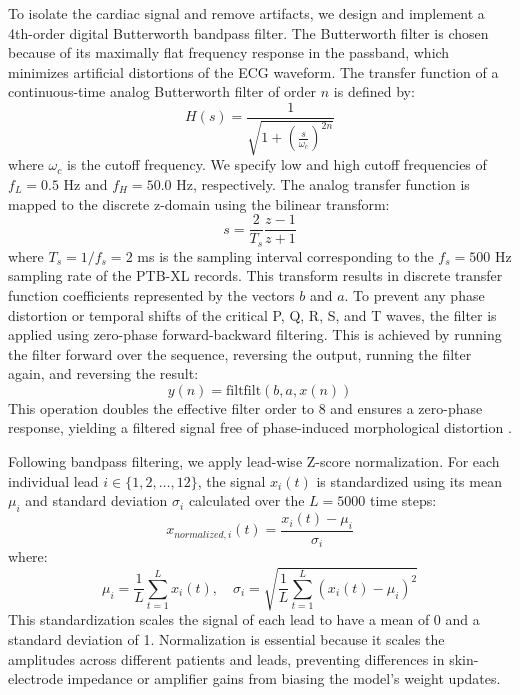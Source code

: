 \documentclass[12pt,a4paper]{report}
\begin{document}
To isolate the cardiac signal and remove artifacts, we design and implement a 4th-order digital Butterworth bandpass filter. The Butterworth filter is chosen because of its maximally flat frequency response in the passband, which minimizes artificial distortions of the ECG waveform. The transfer function of a continuous-time analog Butterworth filter of order $n$ is defined by:
\begin{equation}
    H(s) = \frac{1}{\sqrt{1 + \left(\frac{s}{\omega_c}\right)^{2n}}}
\end{equation}
where $\omega_c$ is the cutoff frequency. We specify low and high cutoff frequencies of $f_L = 0.5$ Hz and $f_H = 50.0$ Hz, respectively. The analog transfer function is mapped to the discrete z-domain using the bilinear transform:
\begin{equation}
    s = \frac{2}{T_s} \frac{z - 1}{z + 1}
\end{equation}
where $T_s = 1/f_s = 2$ ms is the sampling interval corresponding to the $f_s = 500$ Hz sampling rate of the PTB-XL records. This transform results in discrete transfer function coefficients represented by the vectors $b$ and $a$. To prevent any phase distortion or temporal shifts of the critical P, Q, R, S, and T waves, the filter is applied using zero-phase forward-backward filtering. This is achieved by running the filter forward over the sequence, reversing the output, running the filter again, and reversing the result:
\begin{equation}
    y(n) = \text{filtfilt}(b, a, x(n))
\end{equation}
This operation doubles the effective filter order to 8 and ensures a zero-phase response, yielding a filtered signal free of phase-induced morphological distortion \cite{strodthoff2021deep}.

Following bandpass filtering, we apply lead-wise Z-score normalization. For each individual lead $i \in \{1, 2, \dots, 12\}$, the signal $x_{i}(t)$ is standardized using its mean $\mu_{i}$ and standard deviation $\sigma_{i}$ calculated over the $L=5000$ time steps:
\begin{equation}
    x_{normalized, i}(t) = \frac{x_{i}(t) - \mu_{i}}{\sigma_{i}}
\end{equation}
where:
\begin{equation}
    \mu_{i} = \frac{1}{L} \sum_{t=1}^{L} x_{i}(t), \quad \sigma_{i} = \sqrt{\frac{1}{L} \sum_{t=1}^{L} (x_{i}(t) - \mu_{i})^2}
\end{equation}
This standardization scales the signal of each lead to have a mean of 0 and a standard deviation of 1. Normalization is essential because it scales the amplitudes across different patients and leads, preventing differences in skin-electrode impedance or amplifier gains from biasing the model's weight updates.
\end{document}
